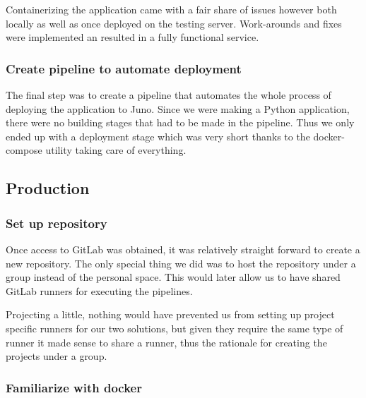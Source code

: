 Containerizing the application came with a fair share of issues
however both locally as well as once deployed on the testing server.
Work-arounds and fixes were implemented an resulted in a fully
functional service.

\subsubsection{Create pipeline to automate deployment}

The final step was to create a pipeline that automates the whole
process of deploying the application to Juno. Since we were making a
Python application, there were no building stages that had to be made
in the pipeline. Thus we only ended up with a deployment stage which
was very short thanks to the docker-compose utility taking care of
everything.


\subsection{Production}





\subsubsection{Set up repository}

Once access to GitLab was obtained, it was relatively straight forward
to create a new repository. The only special thing we did was to host
the repository under a group instead of the personal space. This would
later allow us to have shared GitLab runners for executing the
pipelines.

Projecting a little, nothing would have prevented us from setting up
project specific runners for our two solutions, but given they require
the same type of runner it made sense to share a runner, thus the
rationale for creating the projects under a group.

\subsubsection{Familiarize with docker}

